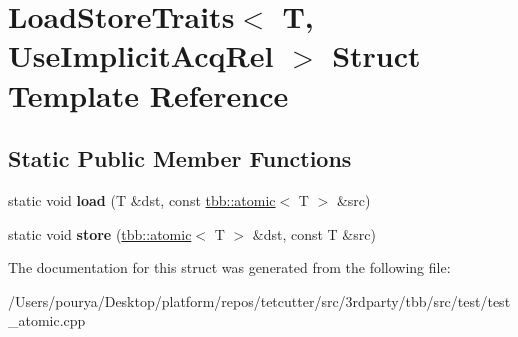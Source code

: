 \hypertarget{structLoadStoreTraits_3_01T_00_01UseImplicitAcqRel_01_4}{}\section{Load\+Store\+Traits$<$ T, Use\+Implicit\+Acq\+Rel $>$ Struct Template Reference}
\label{structLoadStoreTraits_3_01T_00_01UseImplicitAcqRel_01_4}
\subsection*{Static Public Member Functions}
\begin{DoxyCompactItemize}
\item 
\hypertarget{structLoadStoreTraits_3_01T_00_01UseImplicitAcqRel_01_4_a2d4618e86aa14a260f03a53540a78dba}{}static void {\bfseries load} (T \&dst, const \hyperlink{structtbb_1_1atomic}{tbb\+::atomic}$<$ T $>$ \&src)\label{structLoadStoreTraits_3_01T_00_01UseImplicitAcqRel_01_4_a2d4618e86aa14a260f03a53540a78dba}

\item 
\hypertarget{structLoadStoreTraits_3_01T_00_01UseImplicitAcqRel_01_4_a8c171a21782fdcbd37539892464ed093}{}static void {\bfseries store} (\hyperlink{structtbb_1_1atomic}{tbb\+::atomic}$<$ T $>$ \&dst, const T \&src)\label{structLoadStoreTraits_3_01T_00_01UseImplicitAcqRel_01_4_a8c171a21782fdcbd37539892464ed093}

\end{DoxyCompactItemize}


The documentation for this struct was generated from the following file\+:\begin{DoxyCompactItemize}
\item 
/\+Users/pourya/\+Desktop/platform/repos/tetcutter/src/3rdparty/tbb/src/test/test\+\_\+atomic.\+cpp\end{DoxyCompactItemize}
